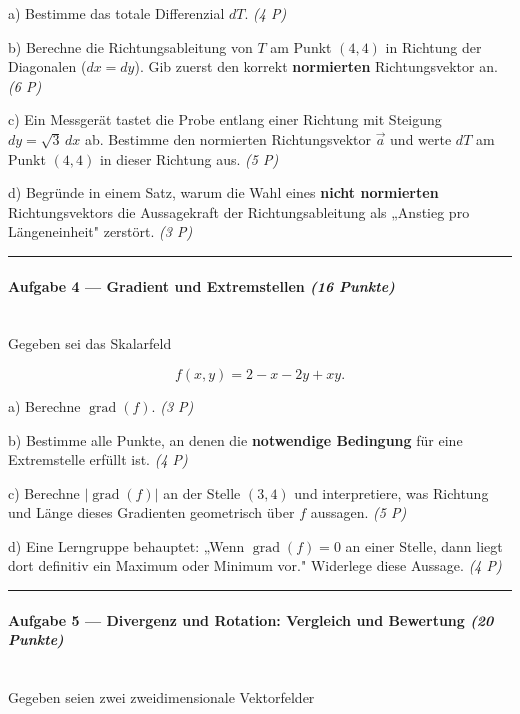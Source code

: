 \documentclass[11pt, a4paper]{article}
\begin{document}
a) Bestimme das totale Differenzial $dT$. \textit{(4 P)}


b) Berechne die Richtungsableitung von $T$ am Punkt $(4, 4)$ in Richtung der Diagonalen ($dx = dy$). Gib zuerst den korrekt \textbf{normierten} Richtungsvektor an. \textit{(6 P)}


c) Ein Messgerät tastet die Probe entlang einer Richtung mit Steigung $dy = \sqrt{3}\,dx$ ab. Bestimme den normierten Richtungsvektor $\vec{a}$ und werte $dT$ am Punkt $(4,4)$ in dieser Richtung aus. \textit{(5 P)}


d) Begründe in einem Satz, warum die Wahl eines \textbf{nicht normierten} Richtungsvektors die Aussagekraft der Richtungsableitung als „Anstieg pro Längeneinheit" zerstört. \textit{(3 P)}



\noindent\textcolor{rulegray}{\rule{\linewidth}{0.4pt}}


\paragraph{Aufgabe 4 — Gradient und Extremstellen \textit{(16 Punkte)}}\mbox{}\\[2pt]

Gegeben sei das Skalarfeld


\[
f(x,y) = 2 - x - 2y + xy.
\]


a) Berechne $\operatorname{grad}(f)$. \textit{(3 P)}


b) Bestimme alle Punkte, an denen die \textbf{notwendige Bedingung} für eine Extremstelle erfüllt ist. \textit{(4 P)}


c) Berechne $|\operatorname{grad}(f)|$ an der Stelle $(3, 4)$ und interpretiere, was Richtung und Länge dieses Gradienten geometrisch über $f$ aussagen. \textit{(5 P)}


d) Eine Lerngruppe behauptet: „Wenn $\operatorname{grad}(f) = 0$ an einer Stelle, dann liegt dort definitiv ein Maximum oder Minimum vor." Widerlege diese Aussage. \textit{(4 P)}



\noindent\textcolor{rulegray}{\rule{\linewidth}{0.4pt}}


\paragraph{Aufgabe 5 — Divergenz und Rotation: Vergleich und Bewertung \textit{(20 Punkte)}}\mbox{}\\[2pt]

Gegeben seien zwei zweidimensionale Vektorfelder
\end{document}
